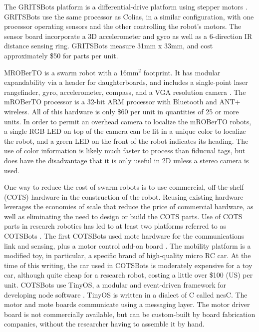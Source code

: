 \documentclass[]{article}
\begin{document}
The GRITSBots platform is a differential-drive platform using stepper motors \cite{pickem2015gritsbot}.
GRITSBots use the same processor as Colias, in a similar configuration, with one processor operating sensors and the other controlling the robot's motors. 
The sensor board incorporate a 3D accelerometer and gyro as well as a 6-direction IR distance sensing ring. 
GRITSBots measure 31mm x 33mm, and cost approximately \$50 for parts per unit. 

MROBerTO is a swarm robot with a 16mm$^2$ footprint. It has modular expandability via a header for daughterboards, and includes a single-point laser rangefinder, gyro, accelerometer, compass, and a VGA resolution camera \cite{Kim2016mROBerTOAM}. 
The mROBerTO processor is a 32-bit ARM processor with Bluetooth and ANT+ wireless. 
All of this hardware is only \$60 per unit in quantities of 25 or more units. 
In order to permit an overhead camera to localize the mROBerTO robots, a single RGB LED on top of the camera can be lit in a unique color to localize the robot, and a green LED on the front of the robot indicates its heading. 
The use of color information is likely much faster to process than fiducual tags, but does have the disadvantage that it is only useful in 2D unless a stereo camera is used. 

One way to reduce the cost of swarm robots is to use commercial, off-the-shelf (COTS) hardware in the construction of the robot. 
Reusing existing hardware leverages the economies of scale that reduce the price of commercial hardware, as well as eliminating the need to design or build the COTS parts. 
Use of COTS parts in research robotics has led to at least two platforms referred to as COTSBots \cite{bergbreiter2003cotsbots, soule2011cotsbots}.
The first COTSBots used mote hardware for the communications link and sensing, plus a motor control add-on board \cite{bergbreiter2003cotsbots}. 
The mobility platform is a modified toy, in particular, a specific brand of high-quality micro RC car.
At the time of this writing, the car used in COTSBots is moderately expensive for a toy car, although quite cheap for a research robot, costing a little over \$100 (US) per unit. 
COTSBots use TinyOS, a modular and event-driven framework for developing node software \cite{levis2005tinyos}. 
TinyOS is written in a dialect of C called nesC. The motor and mote boards communicate using a messaging layer. 
The motor driver board is not commercially available, but can be custom-built by board fabrication companies, without the researcher having to assemble it by hand. 
\end{document}
